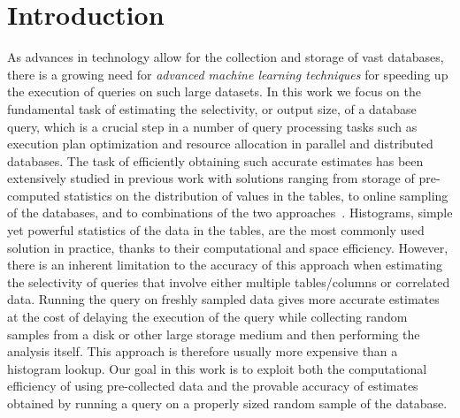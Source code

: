 \section{Introduction}\label{sec:vcfreqintro}
As advances in technology allow for the collection and storage of vast
databases, there is a growing need for \emph{advanced machine learning
techniques} for speeding up the execution of queries on such large datasets. In this work we
focus on the fundamental task of estimating the selectivity, or output size, of
a database query, which is a crucial step in a number of query processing tasks
such as execution plan optimization and resource allocation in parallel and
distributed databases. The task of efficiently obtaining such accurate estimates
has been extensively studied in previous work with solutions ranging from
storage of pre-computed statistics on the distribution of values in the tables,
to online sampling of the databases, and to combinations of the two
approaches~\citep{LiptonN95,LiptonNS90,HaasS92,HouOD91,HaasS95,GangulyGMS96,GantiLR00,GibbonsM98,HouOT88,LarsonLZZ07,PoosalaI97}.
Histograms, simple yet powerful statistics of the data in the tables, are the most
commonly used solution in practice, thanks to their computational and space
efficiency. However, there is an inherent limitation to the accuracy of this
approach when estimating the selectivity of queries that involve either multiple
tables/columns or correlated data. Running the query on freshly sampled data
gives more accurate estimates at the cost of delaying the execution of the query
while collecting random samples from a disk or other large storage medium and
then performing the analysis itself. This approach is therefore usually more
expensive than a histogram lookup. Our goal in this work is to exploit both the
computational efficiency of using pre-collected data and the provable accuracy
of estimates obtained by running a query on a properly sized random sample of
the database.

